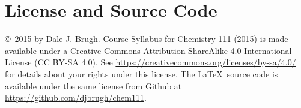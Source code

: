 \documentclass[letterpaper,oneside,onecolumn,11pt,article]{memoir}
\begin{document}
\section{License and Source Code}
\copyright\ 2015 by Dale J. Brugh. Course Syllabus for Chemistry 111 (2015) is made available under a Creative Commons Attribution-ShareAlike 4.0 International License (CC BY-SA 4.0). See \href{https://creativecommons.org/licenses/by-sa/4.0/}{https://creativecommons.org/licenses/by-sa/4.0/} for details about your rights under this license. The \LaTeX\ source code is available under the same license from Github at \href{https://github.com/djbrugh/chem111}{https://github.com/djbrugh/chem111}. 
%
%
\end{document}
